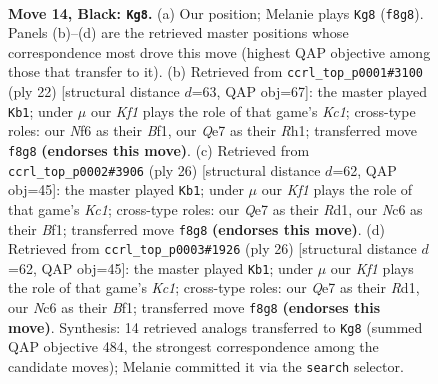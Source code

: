 \documentclass[11pt]{article}
\begin{document}
\clearpage

\begin{figure}[p]\centering
\begin{subfigure}{0.46\textwidth}\centering
\resizebox{\linewidth}{!}{%
\newchessgame
\chessboard[
  setfen={r1b1rk2/ppp1qpp1/2n2n1p/P3p2P/2P5/2P1P1P1/3B1P2/R2QKBNR b KQ - 1 14},
  showmover=false,
  pgfstyle=straightmove, color=movearrow, markmove={f8-g8}
]}
\caption{}
\end{subfigure}\hfill
\begin{subfigure}{0.46\textwidth}\centering
\resizebox{\linewidth}{!}{%
\newchessgame
\chessboard[
  setfen={rn1qkb1r/3b1p2/p2ppp2/1p5p/3NPP2/2N5/PPPQ2PP/2KR1B1R w kq - 0 12},
  showmover=false,
  pgfstyle=straightmove, color=movearrow, markmove={c1-b1}
]}
\caption{}
\end{subfigure}
\\[4pt]
\begin{subfigure}{0.46\textwidth}\centering
\resizebox{\linewidth}{!}{%
\newchessgame
\chessboard[
  setfen={r1b1k2r/2q1bppp/p1npp3/1p6/4PP1P/PNN5/1PPQ2P1/2KR1B1R w kq - 0 14},
  showmover=false,
  pgfstyle=straightmove, color=movearrow, markmove={c1-b1}
]}
\caption{}
\end{subfigure}\hfill
\begin{subfigure}{0.46\textwidth}\centering
\resizebox{\linewidth}{!}{%
\newchessgame
\chessboard[
  setfen={r1b1k2r/2q1bppp/p1npp3/1p6/4PP1P/PNN5/1PPQ2P1/2KR1B1R w kq - 1 14},
  showmover=false,
  pgfstyle=straightmove, color=movearrow, markmove={c1-b1}
]}
\caption{}
\end{subfigure}
\caption{\textbf{Move 14, Black: \texttt{Kg8}.} (a) Our position; Melanie plays \texttt{Kg8} (\texttt{f8g8}). Panels (b)--(d) are the retrieved master positions whose correspondence most drove this move (highest QAP objective among those that transfer to it). (b) Retrieved from \texttt{ccrl\_top\_p0001\#3100} (ply 22) [structural distance $d$=63, QAP obj=67]: the master played \texttt{Kb1}; under $\mu$ our \emph{Kf1} plays the role of that game's \emph{Kc1}; cross-type roles: our \emph{N}f6 as their \emph{B}f1, our \emph{Q}e7 as their \emph{R}h1; transferred move \texttt{f8g8} \textbf{(endorses this move)}. (c) Retrieved from \texttt{ccrl\_top\_p0002\#3906} (ply 26) [structural distance $d$=62, QAP obj=45]: the master played \texttt{Kb1}; under $\mu$ our \emph{Kf1} plays the role of that game's \emph{Kc1}; cross-type roles: our \emph{Q}e7 as their \emph{R}d1, our \emph{N}c6 as their \emph{B}f1; transferred move \texttt{f8g8} \textbf{(endorses this move)}. (d) Retrieved from \texttt{ccrl\_top\_p0003\#1926} (ply 26) [structural distance $d$=62, QAP obj=45]: the master played \texttt{Kb1}; under $\mu$ our \emph{Kf1} plays the role of that game's \emph{Kc1}; cross-type roles: our \emph{Q}e7 as their \emph{R}d1, our \emph{N}c6 as their \emph{B}f1; transferred move \texttt{f8g8} \textbf{(endorses this move)}. Synthesis: 14 retrieved analogs transferred to \texttt{Kg8} (summed QAP objective 484, the strongest correspondence among the candidate moves); Melanie committed it via the \texttt{search} selector.}
\label{fig:thought-m27}
\end{figure}
\end{document}
